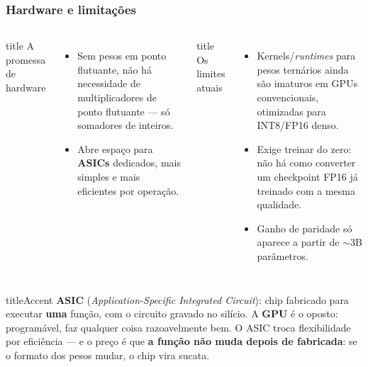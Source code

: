 \begin{frame}[shrink]
	\frametitle{Hardware e limitações}
	\begin{columns}
		\begin{beamercolorbox}[sep=5pt,rounded=true,shadow=true]{title}
			A promessa de hardware
		\end{beamercolorbox}
		\begin{itemize}
			\item Sem pesos em ponto flutuante, não há necessidade de multiplicadores de ponto flutuante --- só somadores de inteiros.
			\item Abre espaço para \textbf{ASICs} dedicados, mais simples e mais eficientes por operação.
		\end{itemize}
		\begin{beamercolorbox}[sep=5pt,rounded=true,shadow=true]{title}
			Os limites atuais
		\end{beamercolorbox}
		\begin{itemize}
			\item Kernels/\textit{runtimes} para pesos ternários ainda são imaturos em GPUs convencionais, otimizadas para INT8/FP16 denso.
			\item Exige treinar do zero: não há como converter um checkpoint FP16 já treinado com a mesma qualidade.
			\item Ganho de paridade só aparece a partir de $\sim$3B parâmetros.
		\end{itemize}
	\end{columns}
	\vspace{2pt}
	\begin{beamercolorbox}[sep=3pt,rounded=true]{titleAccent}
		\scriptsize
		\textbf{ASIC} (\textit{Application-Specific Integrated Circuit}): chip fabricado para executar \textbf{uma} função, com o circuito gravado no silício. A \textbf{GPU} é o oposto: programável, faz qualquer coisa razoavelmente bem. O ASIC troca flexibilidade por eficiência --- e o preço é que \textbf{a função não muda depois de fabricada}: se o formato dos pesos mudar, o chip vira sucata.
	\end{beamercolorbox}
\end{frame}
